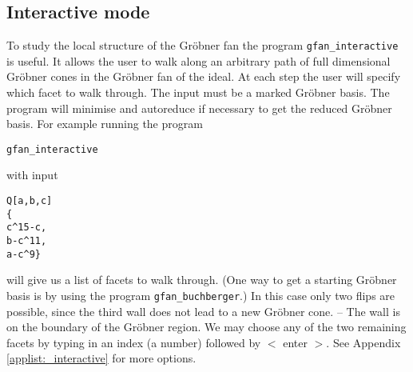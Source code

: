 \subsection{Interactive mode}
To study the local structure of the Gr\"obner fan the program \texttt{gfan\_interactive} is useful. It allows the user to walk along an arbitrary path of full dimensional Gr\"obner cones in the Gr\"obner fan of the ideal. At each step the user will specify which facet to walk through. The input must be a marked Gr\"obner basis. The program will minimise and autoreduce if necessary to get the reduced Gr\"obner basis. For example running the program
\begin{verbatim}
gfan_interactive
\end{verbatim}
with input
\begin{verbatim}
Q[a,b,c]
{
c^15-c,
b-c^11,
a-c^9}
\end{verbatim}
will give us a list of facets to walk through. (One way to get a starting Gr\"obner basis is by using the program \texttt{gfan\_buchberger}.) In this case only two flips are possible, since the third wall does not lead to a new Gr\"obner cone. -- The wall is on the boundary of the Gr\"obner region. We may choose any of the two remaining facets by typing in an index (a number) followed by $<$ enter $>$. See Appendix \ref{applist:_interactive} for more options.
%
